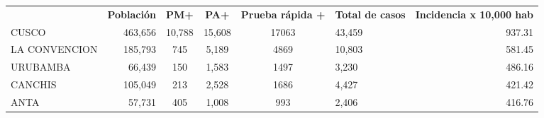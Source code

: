 \begin{tabular}{lrccclr}
	\rowcolor[HTML]{DCE6F1} 
	\multicolumn{1}{c}{\cellcolor[HTML]{DCE6F1}\textbf{PROVINCIA}} & \multicolumn{1}{c}{\cellcolor[HTML]{DCE6F1}\textbf{Población}} & \textbf{PM+}                                                & \textbf{PA+}         & \textbf{Prueba rápida +} & \multicolumn{1}{c}{\cellcolor[HTML]{DCE6F1}\textbf{Total de casos}} & \multicolumn{1}{c}{\cellcolor[HTML]{DCE6F1}\textbf{Incidencia x 10,000 hab}} \\
	\cellcolor[HTML]{FF5050}CUSCO                                  & 463,656                                                        & 10,788                                                      & 15,608               & 17063                    & 43,459                                                              & 937.31                                                                       \\
	\cellcolor[HTML]{F4B084}LA   CONVENCION                        & 185,793                                                        & 745                                                         & 5,189                & 4869                     & 10,803                                                              & 581.45                                                                       \\
	\cellcolor[HTML]{F4B084}URUBAMBA                               & 66,439                                                         & 150                                                         & 1,583                & 1497                     & 3,230                                                               & 486.16                                                                       \\
	\cellcolor[HTML]{FFE699}CANCHIS                                & 105,049                                                        & 213                                                         & 2,528                & 1686                     & 4,427                                                               & 421.42                                                                       \\
	\cellcolor[HTML]{FFE699}ANTA                                   & 57,731                                                         & 405                                                         & 1,008                & 993                      & 2,406                                                               & 416.76                                                                       \\

\end{tabular}
